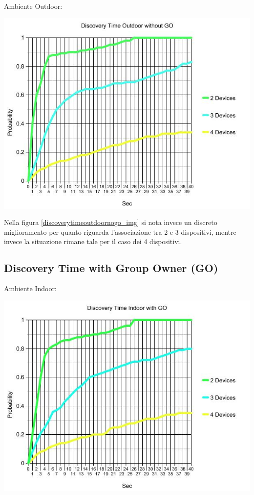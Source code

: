 Ambiente Outdoor:
\begin{center}
\includegraphics[width=1\textwidth]{imgs/Discovery_Time_Outdoor_no_GO.jpg}
\label{discoverytimeoutdoornogo_img}%
\end{center}

Nella figura \ref{discoverytimeoutdoornogo_img} si nota invece un discreto miglioramento per quanto riguarda l'associazione tra 2 e 3 dispositivi, mentre invece la situazione rimane tale per il caso dei 4 dispositivi.

\subsection{Discovery Time with Group Owner (GO)}

Ambiente Indoor:
\begin{center}
\includegraphics[width=1\textwidth]{imgs/Discovery_Time_Indoor_with_GO.jpg}
\label{discoverytimeindoorwithgo_img}%
\end{center}

